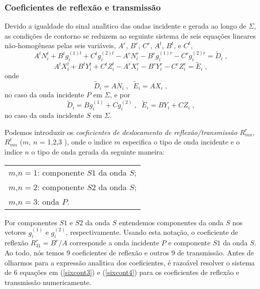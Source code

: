 \subsubsection{Coeficientes de reflex\~ao e transmiss\~ao}

Devido a igualdade do sinal anal\'{\i}tico das ondas incidente e
gerada ao longo de $\Sigma$, as condi\c{c}\~oes de contorno se
reduzem ao seguinte sistema de seis equa\c{c}\~oes lineares
n\~ao-homog\^eneas pelas seis vari\'aveis, $A^r$, $B^r$, $C^r$,
$A^t$, $B^t$, e $C^t$,
\begin{equation}
A^tN_i^t+B^tg_i^{(1)t}+C^tg_i^{(2)t}-A^rN_i^r-B^rg_i^{(1)r}-C^rg_i^{(2)r}=\tilde{D}_i
\;, \label{sixcont3}
\end{equation}
\begin{equation}
A^tX_i^t+B^tY_i^t+C^tZ_i^t-A^rX_i^r-B^rY_i^r-C^rZ_i^r=\tilde{E}_i
\;, \label{sixcont4}
\end{equation}
onde
\begin{equation}
\tilde{D}_i=AN_i \;, \;\; \tilde{E}_i=AX_i \;, \label{D e E tios
P}
\end{equation}
no caso da onda incidente $P$ em $\Sigma$, e por
\begin{equation}
\tilde{D}_i=Bg_i^{(1)}+Cg_i^{(2)} \;, \;\; \tilde{E}_i=BY_i+CZ_i
\;, \label{D e E tios S}
\end{equation}
no caso da onda incidente $S$ em $\Sigma$.

Podemos introduzir os {\it coeficientes de deslocamento de
reflex\~ao/transmiss\~ao} $R_{mn}^r$, $R_{mn}^t$ ($m$, $n$ = 1,2,3
), onde o \'{\i}ndice $m$ especifica o tipo de onda incidente e o
\'{\i}ndice $n$ o tipo de onda gerada da seguinte maneira:

\begin{tabular}{l}
$m$,$n=1$: componente $S1$ da onda $S$;\\
$m$,$n=2$: componente $S2$ da onda $S$;\\
$m$,$n=3$: onda $P$.
\end{tabular}

Por componentes $S1$ e $S2$ da onda $S$ entendemos componentes da
onda $S$ nos vetores $g_i^{(1)}$ e $g_i^{(2)}$, respectivamente.
Usando esta nota\c{c}\~ao, o coeficiente de reflex\~ao
$R_{31}^r=B^r/A$ corresponde a onda incidente $P$ e componente
$S1$ da onda $S$. Ao todo, n\'os temos 9 coeficientes de
reflex\~ao e outros 9 de transmiss\~ao. Antes de olharmos para a
express\~ao anal\'{\i}tica dos coeficientes, \'e razo\'avel
resolver o sistema de 6 equa\c{c}\~oes em (\ref{sixcont3}) e
(\ref{sixcont4}) para os coeficientes de reflex\~ao e
transmiss\~ao numericamente.

